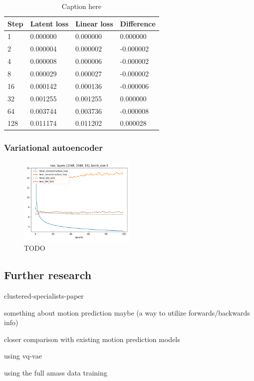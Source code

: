 \begin{table}[]
\centering
\begin{tabular}{@{}llll@{}}
\toprule
Step & Latent loss & Linear loss & Difference \\ \midrule
1    & 0.000000    & 0.000000    & 0.000000   \\
2    & 0.000004    & 0.000002    & -0.000002  \\
4    & 0.000008    & 0.000006    & -0.000002  \\
8    & 0.000029    & 0.000027    & -0.000002  \\
16   & 0.000142    & 0.000136    & -0.000006  \\
32   & 0.001255    & 0.001255    & 0.000000   \\
64   & 0.003744    & 0.003736    & -0.000008  \\
128  & 0.011174    & 0.011202    & 0.000028   \\ \bottomrule
\end{tabular}
\caption{Caption here}
\label{tab:ae-eval}
\end{table}



\subsubsection{Variational autoencoder}\label{subsubsec:vae}
\begin{figure}[h]
\centering
\includegraphics[width=0.5\textwidth]{img/vae_2048-2048-16_batch-8_losses}
\caption{TODO}
\label{fig:vae-loss}
\end{figure}


\subsection{Further research}\label{subsec:further-research}
clustered-specialists-paper~\cite{won2020scalable}

something about motion prediction maybe (a way to utilize forwards/backwards info)

closer comparison with existing motion prediction models

using vq-vae

using the full amass data training

